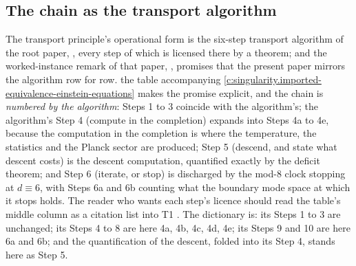 \documentclass[11pt]{article}
\theoremstyle{definition}
\theoremstyle{plain}
\begin{document}
\subsection*{The chain as the transport algorithm}
\label{c:note.singularity.setting-chain-transport-algorithm}
The transport principle's operational form is the six-step transport algorithm of the root paper, \cite[\S 8.1, Table 1]{ButlerT1}, every step of which is licensed there by a theorem; and the worked-instance remark of that paper, \cite[Rem.~8.3]{ButlerT1}, promises that the present paper mirrors the algorithm row for row. the table accompanying \ref{c:singularity.imported-equivalence-einstein-equations} makes the promise explicit, and the chain is \emph{numbered by the algorithm}: Steps 1 to 3 coincide with the algorithm's; the algorithm's Step 4 (compute in the completion) expands into Steps 4a to 4e, because the computation in the completion is where the temperature, the statistics and the Planck sector are produced; Step 5 (descend, and state what descent costs) is the descent computation, quantified exactly by the deficit theorem; and Step 6 (iterate, or stop) is discharged by the mod-8 clock stopping at $d \equiv 6$, with Steps 6a and 6b counting what the boundary mode space at which it stops holds. The reader who wants each step's licence should read the table's middle column as a citation list into T1 \cite{ButlerT1}. The dictionary is: its Steps 1 to 3 are unchanged; its Steps 4 to 8 are here 4a, 4b, 4c, 4d, 4e; its Steps 9 and 10 are here 6a and 6b; and the quantification of the descent, folded into its Step 4, stands here as Step 5.
\end{document}
